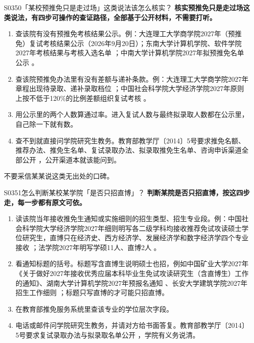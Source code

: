 \begin{qa}{S0350}{「某校预推免只是走过场」这类说法该怎么核实？}
\textbf{核实预推免只是走过场这类说法，有四步可操作的查证路径，全部基于公开材料，不需要打听。}

\begin{enumerate}
  \item 查该院有没有预推免考核结果公示。例：大连理工大学商学院2027年（预推免）复试考核结果公示（2026年9月20日）；东南大学计算机学院、软件学院2027年考核结果与考核入选名单 ；中南大学计算机学院2027年拟预推免名单公示 。
  \item 查该院预推免办法里有没有差额与递补条款。例：大连理工大学商学院2027年章程出现待录取、递补录取档位 ；中国社会科学院大学经济学院2027年原则上按不低于120\%的比例差额组织复试考核 。
  \item 用公示里的两个人数算通过率。进入复试人数与最终拟录取人数都在公示里，自己除一下就有数。
  \item 查不到就直接问学院研究生教务。教育部教学厅〔2014〕5号要求推免名额、推荐办法、推免生名单、复试录取办法、拟录取推免生名单、咨询申诉渠道全部公开 ，公开渠道本就该能问到。
\end{enumerate}

不要采信某某说这类无出处的口碑。
\end{qa}

\begin{qa}{S0351}{怎么判断某校某学院「是否只招直博」？}
\textbf{判断某院是否只招直博，按这四步走，每一步都有原文可依。}

\begin{enumerate}
  \item 读该院当年接收推免生通知或实施细则的招生类型、招生专业段。例：中国社会科学院大学经济学院2027年细则明写各二级学科均接收推荐免试攻读硕士学位研究生，直博只在经济史、西方经济学、发展经济学和数字经济学四个专业接收 ；法学院2027年明写学硕11人、直博2人 。
  \item 看通知标题的括号。标题写含直博生说明硕士也招，例如中国矿业大学2027年《关于做好2027年接收优秀应届本科毕业生免试攻读研究生（含直博生）工作的通知》、湖南大学计算机学院2027年预报名通知 、长安大学建筑学院2027年招生工作细则 ；标题只写直博的才可能只招直博。
  \item 在教育部推免服务系统里查该专业的学位层次字段。
  \item 电话或邮件问学院研究生教务，并请对方给书面答复。教育部教学厅〔2014〕5号要求复试录取办法与拟录取名单公开 ，学院有义务说清。
\end{enumerate}
\end{qa}

